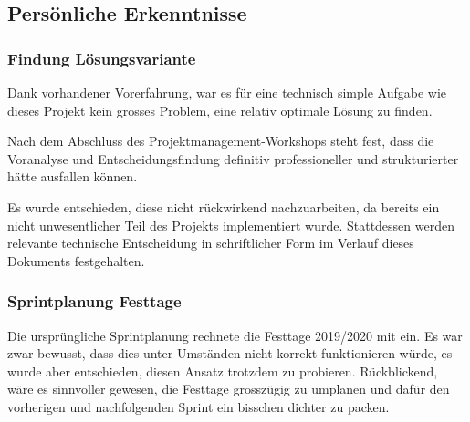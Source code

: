 \subsection{Persönliche Erkenntnisse}
\subsubsection*{Findung Lösungsvariante}
Dank vorhandener Vorerfahrung, war es für eine technisch simple Aufgabe wie dieses Projekt kein grosses Problem, eine relativ optimale Lösung zu finden.

Nach dem Abschluss des Projektmanagement-Workshops steht fest, dass die Voranalyse und Entscheidungsfindung definitiv professioneller und strukturierter hätte ausfallen können.

Es wurde entschieden, diese nicht rückwirkend nachzuarbeiten, da bereits ein nicht unwesentlicher Teil des Projekts implementiert wurde. Stattdessen werden relevante technische Entscheidung in schriftlicher Form im Verlauf dieses Dokuments festgehalten.

\subsubsection*{Sprintplanung Festtage}
Die ursprüngliche Sprintplanung rechnete die Festtage 2019/2020 mit ein.
Es war zwar bewusst, dass dies unter Umständen nicht korrekt funktionieren würde, es wurde aber entschieden, diesen Ansatz trotzdem zu probieren.
Rückblickend, wäre es sinnvoller gewesen, die Festtage grosszügig zu umplanen und dafür den vorherigen und nachfolgenden Sprint ein bisschen dichter zu packen.

